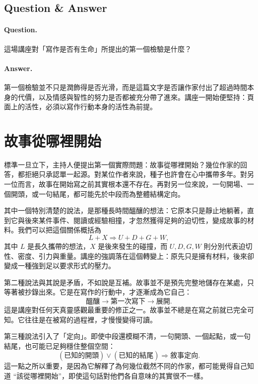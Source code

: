 \subsection{Question \& Answer}

\paragraph{Question.} 這場講座對「寫作是否有生命」所提出的第一個檢驗是什麼？

\paragraph{Answer.} 第一個檢驗並不只是潤飾得是否光滑，而是這篇文字是否讓作家付出了超過時間本身的代價，以及情感與智性的努力是否都被充分帶了進來。講座一開始便堅持：頁面上的活性，必須以寫作行動本身的活性為前提。

\section{故事從哪裡開始}

標準一旦立下，主持人便提出第一個實際問題：故事從哪裡開始？幾位作家的回答，都拒絕只承認單一起源。對某位作者來說，種子也許會在心中攜帶多年。對另一位而言，故事在開始寫之前其實根本還不存在。再對另一位來說，一句開場、一個開頭，或一句結尾，都可能先於中段而為整體結構定向。

其中一個特別清楚的說法，是那種長時間醞釀的想法：它原本只是靜止地躺著，直到它與後來某件事件、閱讀或經驗相撞，才忽然獲得足夠的迫切性，變成故事的材料。我們可以把這個關係概括為
\begin{equation}
L + X \Rightarrow U + D + G + W,
\end{equation}
其中 \(L\) 是長久攜帶的想法，\(X\) 是後來發生的碰撞，而 \(U,D,G,W\) 則分別代表迫切性、密度、引力與重量。講座的強調落在這個轉變上：原先只是擁有材料，後來卻變成一種強到足以要求形式的壓力。

第二種說法與其說是矛盾，不如說是互補。故事並不是預先完整地儲存在某處，只等著被抄錄出來。它是在寫作的行動中，才逐漸成為它自己：
\begin{equation}
\text{醞釀} \to \text{第一次寫下} \to \text{展開}.
\end{equation}
這是講座對任何天真靈感觀最重要的修正之一。故事並不總是在寫之前就已完全可知。它往往是在被寫的過程裡，才慢慢變得可讀。

第三種說法引入了「定向」。即使中段還模糊不清，一句開頭、一個起點，或一句結尾，也可能已足夠穩住整個空間：
\begin{equation}
(\text{已知的開頭}) \lor (\text{已知的結尾}) \Rightarrow \text{敘事定向}.
\end{equation}
這一點之所以重要，是因為它解釋了為何幾位截然不同的作家，都可能覺得自己知道 ``該從哪裡開始''，即使這句話對他們各自意味的其實很不一樣。

